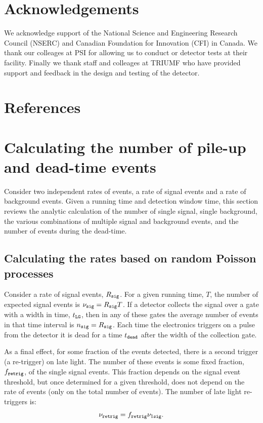 \documentclass[letter,twocolumn,preprint,3p,numbers,sort&compress]{elsarticle}
\begin{document}
\section{Acknowledgements}

We acknowledge support of the National Science and Engineering
Research Council (NSERC) and Canadian Foundation for Innovation (CFI)
in Canada.  We thank our colleages at PSI for allowing us to conduct
or detector tests at their facility.  Finally we thank staff and
colleages at TRIUMF who have provided support and feedback in the
design and testing of the detector.

\section*{References}


%
%

\appendix

\section{Calculating the number of pile-up and dead-time events}\label{sec:stats}

Consider two independent rates of events, a rate of signal events and
a rate of background events.  Given a running time and detection
window time, this section reviews the analytic calculation of the
number of single signal, single background, the various combinations
of multiple signal and background events, and the number of events
during the dead-time.

\subsection{Calculating the rates based on random Poisson processes}

Consider a rate of signal events, $R_{\tt sig}$.  For a given running
time, $T$, the number of expected signal events is $\nu_{\tt sig} =
R_{\tt sig} T$.  If a detector collects the signal over a gate with a
width in time, $t_{\tt LG}$, then in any of these gates the average
number of events in that time interval is $n_{\tt sig} = R_{\tt sig}$.
Each time the electronics triggers on a pulse from the detector it is
dead for a time $t_{\tt dead}$ after the width of the collection gate.

As a final effect, for some fraction of the events detected, there is
a second trigger (a re-trigger) on late light.  The number of these
events is some fixed fraction, $f_{\tt retrig}$, of the single signal
events.  This fraction depends on the signal event threshold, but once
determined for a given threshold, does not depend on the rate of
events (only on the total number of events).  The number of late light
re-triggers is:
\begin{equation}\label{eq:retrig}
\nu_{\tt retrig} = f_{\tt retrig} \nu_{1\tt sig}.
\end{equation}
\end{document}
